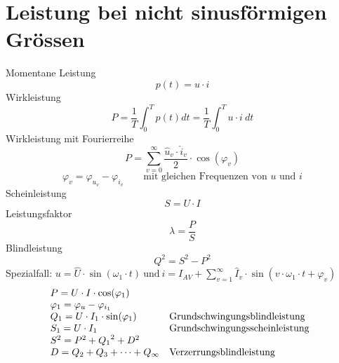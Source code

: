 \section{Leistung bei nicht sinusförmigen Grössen}
Momentane Leistung
\[ p(t) = u \cdot i \]
Wirkleistung
\[ P = \frac{1}{T} \int_{0}^{T} p(t) dt 
= \frac{1}{T} \int_{0}^{T} u \cdot i ~ dt \]
Wirkleistung mit Fourierreihe
\[ P = \sum_{v=0}^{\infty} \frac{\hat{u}_v 
\cdot \hat{i}_v}{2} \cdot \cos(\varphi_v) \]
\[ \varphi_v = \varphi_{u_v} - \varphi_{i_v} 
\qquad \text{mit gleichen Frequenzen von $u$ und $i$} \]
Scheinleistung
\[ S = U \cdot I \]
Leistungsfaktor
\[ \lambda = \frac{P}{S} \]
Blindleistung
\[ Q^2 = S^2 - P^2 \]
Spezialfall: $u = \hat{U} \cdot \sin(\omega_1 \cdot t) ~ \text{und} ~ i 
= I_{AV} + \sum\limits_{v=1}^{\infty} \hat{I}_v \cdot 
\sin(v\cdot \omega_1 \cdot t + \varphi_v)$
\[ \begin{array}{@{}ll}
P = U \cdot I \cdot \cos(\varphi_1) \\
\varphi_1 = \varphi_u - \varphi_{i_1} \\
Q_1 = U \cdot I_1 \cdot \sin(\varphi_1) &\text{Grundschwingungsblindleistung} \\
S_1 = U \cdot I_1 &\text{Grundschwingungsscheinleistung} \\
S^2 = P^2 + {Q_1}^2 + D^2 \\
D = {Q_2} + {Q_3} + \dots + {Q_\infty} & \text{Verzerrungsblindleistung} \\
\end{array}  \]